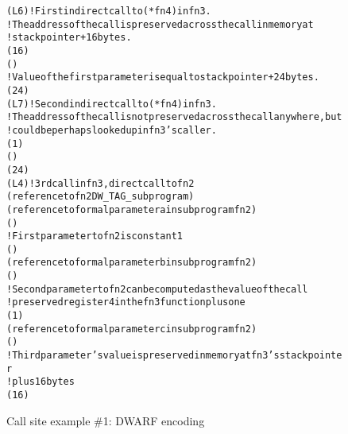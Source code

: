\begin{figure}[h]
\begin{dwflisting}
\begin{alltt}
    \DWTAGcallsite
        \DWATcallreturnpc(L6) ! First indirect call to (*fn4) in fn3.
        ! The address of the call is preserved across the call in memory at
        ! stack pointer + 16 bytes.
        \DWATcalltarget(\DWOPbregthree{} 16 \DWOPderef)
        \DWTAGcallsiteparameter
            \DWATlocation(\DWOPregzero)
            ! Value of the first parameter is equal to stack pointer + 24 bytes.
            \DWATcallvalue(\DWOPbregthree{} 24)
    \DWTAGcallsite
        \DWATcallreturnpc(L7) ! Second indirect call to (*fn4) in fn3.
        ! The address of the call is not preserved across the call anywhere, but
        ! could be perhaps looked up in fn3's caller.
        \DWATcalltarget(\DWOPentryvalue{} 1 \DWOPregone)
        \DWTAGcallsiteparameter
            \DWATlocation(\DWOPregzero)
            \DWATcallvalue(\DWOPbregthree{} 24)
    \DWTAGcallsite
        \DWATcallreturnpc(L4) ! 3rd call in fn3, direct call to fn2
        \DWATcallorigin(reference to fn2 DW_TAG_subprogram)
        \DWTAGcallsiteparameter
            \DWATcallparameter(reference to formal parameter a in subprogram fn2)
            \DWATlocation(\DWOPregzero)
            ! First parameter to fn2 is constant 1
            \DWATcallvalue(\DWOPlitone)
        \DWTAGcallsiteparameter
            \DWATcallparameter(reference to formal parameter b in subprogram fn2)
            \DWATlocation(\DWOPregone)
            ! Second parameter to fn2 can be computed as the value of the call
            !   preserved register 4 in the fn3 function plus one
            \DWATcallvalue(\DWOPbregfour{} 1)
        \DWTAGcallsiteparameter
            \DWATcallparameter(reference to formal parameter c in subprogram fn2)
            \DWATlocation(\DWOPregtwo)
            ! Third parameter's value is preserved in memory at fn3's stack pointer
            !   plus 16 bytes
            \DWATcallvalue(\DWOPbregthree{} 16 \DWOPderef)
\end{alltt}
\end{dwflisting}
\caption{Call site example \#1: DWARF encoding}
\label{fig:callsiteexample1dwarf}
\end{figure}

